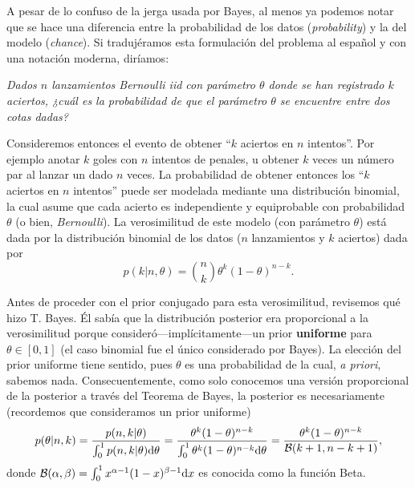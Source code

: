 A pesar de lo confuso de la jerga usada por Bayes, al menos ya podemos notar que se hace una diferencia entre la probabilidad de los datos (\emph{probability}) y la del modelo (\emph{chance}). Si tradujéramos esta formulación del problema al español y con una notación moderna, diríamos: 

\begin{center}
\it
Dados $n$ lanzamientos Bernoulli iid con parámetro $\theta$ donde se han registrado $k$ aciertos, ¿cuál es la probabilidad de que el parámetro $\theta$ se encuentre entre dos cotas dadas?
\end{center}

Consideremos entonces el evento de obtener ``$k$ aciertos en $n$ intentos''. Por ejemplo anotar $k$ goles con $n$ intentos de penales, u obtener $k$ veces un número par al lanzar un dado $n$ veces. La probabilidad de obtener entonces los ``$k$ aciertos en $n$ intentos'' puede ser modelada mediante una distribución binomial, la cual asume que cada acierto es independiente y  equiprobable con probabilidad $\theta$ (o bien, \emph{Bernoulli}). La verosimilitud de este modelo (con parámetro $\theta$) está dada por la distribución binomial de los datos ($n$ lanzamientos y $k$ aciertos) dada por
\begin{equation}
	p(k| n, \theta) = \binom{n}{k} \theta^k (1-\theta)^{n-k}.
\end{equation}

Antes de proceder con el prior conjugado para esta verosimilitud, revisemos qué hizo T. Bayes. Él sabía que la distribución posterior era proporcional a la verosimilitud porque consideró---implícitamente---un prior \textbf{uniforme} para $\theta\in [0,1]$ (el caso binomial fue el único considerado por Bayes). La elección del prior uniforme tiene sentido, pues $\theta$ es una probabilidad de la cual, \emph{a priori}, sabemos nada. Consecuentemente, como solo conocemos una versión proporcional de la posterior a través del Teorema de Bayes,  la posterior es necesariamente (recordemos que consideramos un prior uniforme)
\begin{equation}
	p(\theta|n,k) = \frac{p(n, k| \theta)}{\int_0^1 p(n, k| \theta){\text d} \theta}= \frac{\theta^k (1-\theta)^{n-k}}{\int_0^1 \theta^k (1-\theta)^{n-k}{\text d} \theta}= \frac{\theta^k (1-\theta)^{n-k}}{\mathcal{B}(k+1,n-k+1)},
\end{equation}
donde $\mathcal{B}(\alpha,\beta) = \int_0^1x^{\alpha-1}(1-x)^{\beta-1}{\text d} x$ es conocida como la función Beta.\\

